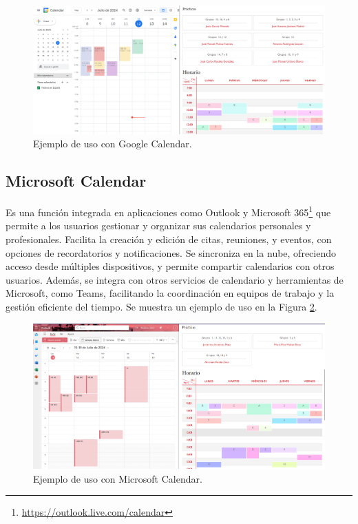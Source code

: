 \begin{figure}[H]
    \centering
    \includegraphics[width=1\textwidth]{./imagenes/Google_Calendar.png}
    \caption{Ejemplo de uso con Google Calendar.}
    \label{fig:google_calendar}
\end{figure}



\subsection{Microsoft Calendar}
Es una función integrada en aplicaciones como Outlook y Microsoft 365\footnote{\url{https://outlook.live.com/calendar}} que permite a los usuarios gestionar y organizar sus calendarios personales y profesionales. Facilita la creación y edición de citas, reuniones, y eventos, con opciones de recordatorios y notificaciones. Se sincroniza en la nube, ofreciendo acceso desde múltiples dispositivos, y permite compartir calendarios con otros usuarios. Además, se integra con otros servicios de calendario y herramientas de Microsoft, como Teams, facilitando la coordinación en equipos de trabajo y la gestión eficiente del tiempo. Se muestra un ejemplo de uso en la Figura \ref{fig:microsoft_calendar}.




\begin{figure}[H]
    \centering
    \includegraphics[width=1\textwidth]{./imagenes/Microsoft_calendar.png}
    \caption{Ejemplo de uso con Microsoft Calendar.}
    \label{fig:microsoft_calendar}
\end{figure}



